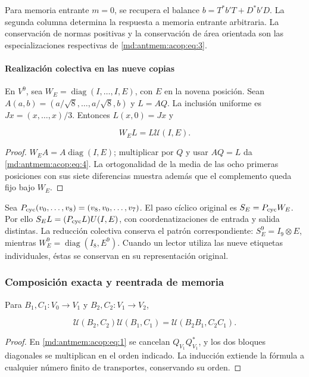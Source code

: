 Para memoria entrante \(m=0\), se recupera el balance \(b=T^*b'T+D^*b'D\). La segunda columna determina la respuesta a memoria entrante arbitraria. La conservación de normas positivas y la conservación de área orientada son las especializaciones respectivas de \eqref{md:antmem:acop:eq:3}.

\paragraph{Realización colectiva en las nueve copias}

En \(V^9\), sea \(W_E=\operatorname{diag}(I,\ldots,I,E)\), con \(E\) en la novena posición. Sean \(A(a,b)=(a/\sqrt8,\ldots,a/\sqrt8,b)\) y \(L=AQ\). La inclusión uniforme es \(Jx=(x,\ldots,x)/3\). Entonces \(L(x,0)=Jx\) y

\begin{equation}
W_E L=L\mathcal U(I,E).
\label{md:antmem:acop:eq:4}
\end{equation}

\begin{proof}
\(W_EA=A\operatorname{diag}(I,E)\); multiplicar por \(Q\) y usar \(AQ=L\) da \eqref{md:antmem:acop:eq:4}. La ortogonalidad de la media de las ocho primeras posiciones con sus siete diferencias muestra además que el complemento queda fijo bajo \(W_E\).
\end{proof}

Sea \(P_{\rm cyc}(v_0,\ldots,v_8)=(v_8,v_0,\ldots,v_7)\). El paso cíclico original es \(S_E=P_{\rm cyc}W_E\). Por ello \(S_EL=(P_{\rm cyc}L)U(I,E)\), con coordenatizaciones de entrada y salida distintas. La reducción colectiva conserva el patrón correspondiente: \(S_E^9=I_9\otimes E\), mientras \(W_E^9=\operatorname{diag}(I_8,E^9)\). Cuando un lector utiliza las nueve etiquetas individuales, éstas se conservan en su representación original.

\subsubsection{Composición exacta y reentrada de memoria}

Para \(B_1,C_1:V_0\to V_1\) y \(B_2,C_2:V_1\to V_2\),

\begin{equation}
\boxed{\mathcal U(B_2,C_2)\mathcal U(B_1,C_1)
=\mathcal U(B_2B_1,C_2C_1).}
\label{md:antmem:acop:eq:5}
\end{equation}

\begin{proof}
En \eqref{md:antmem:acop:eq:1} se cancelan \(Q_{V_1}Q_{V_1}^*\), y los dos bloques diagonales se multiplican en el orden indicado. La inducción extiende la fórmula a cualquier número finito de transportes, conservando su orden.
\end{proof}

